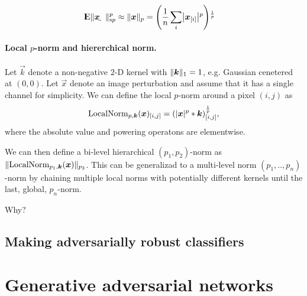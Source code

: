 \documentclass{article}
\begin{document}
\begin{align*}
\E \enVert{\rvec x}_{\text{s}p}^p &\approx \enVert{\vec x}_p = \del{\frac{1}{n}\sum_i \envert{\vec{x}_\ind{i}}^p}^\frac{1}{p}
\end{align*}

\paragraph{Local $p$-norm and hiererchical norm.}
Let $\vec k$ denote a non-negative $2$-D kernel with $\enVert{\vec k}_1=1$, e.g. Gaussian cenetered at $(0,0)$. Let $\vec x$ denote an image perturbation and assume that it has a single channel for simplicity.
We can define the local $p$-norm around a pixel $(i, j)$ as
\begin{align}
    \mathrm{LocalNorm}_{p,\vec k}(\vec x)_\ind{i,j} = \del{\envert{\vec x}^p * \vec k}_\ind{i,j}^\frac{1}{p},
\end{align}
where the absolute value and powering operatons are elementwise.

We can then define a bi-level hierarchical $(p_1,p_2)$-norm as $\enVert{\mathrm{LocalNorm}_{p_1,\vec k}(\vec x)}_{p_2}$. This can be generalizad to a multi-level norm $(p_1,..,p_n)$-norm by chaining multiple local norms with potentially different kernels until the last, global, $p_n$-norm.

Why?




\subsection{Making adversarially robust classifiers}



\section{Generative adversarial networks}
\end{document}
